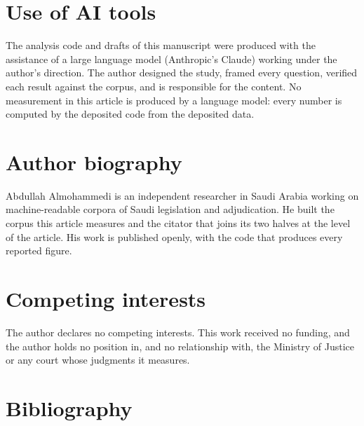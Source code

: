 \documentclass[11pt]{article}
\newif\ifanon
\begin{document}
\section*{Use of AI tools}

The analysis code and drafts of this manuscript were produced with the
assistance of a large language model (Anthropic's Claude) working under the
author's direction. The author designed the study, framed every question,
verified each result against the corpus, and is responsible for the content.
No measurement in this article is produced by a language model: every number
is computed by the deposited code from the deposited data.

\ifanon\else
\section*{Author biography}

Abdullah Almohammedi is an independent researcher in Saudi Arabia working on
machine-readable corpora of Saudi legislation and adjudication. He built the
corpus this article measures and the citator that joins its two halves at the
level of the article. His work is published openly, with the code that
produces every reported figure.

\section*{Competing interests}

The author declares no competing interests. This work received no funding, and
the author holds no position in, and no relationship with, the Ministry of
Justice or any court whose judgments it measures.
\fi

\section*{Bibliography}
\end{document}
